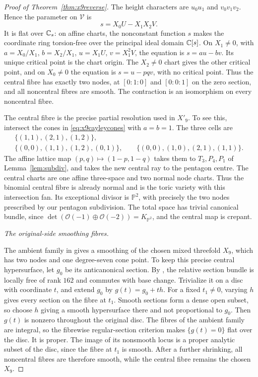 \begin{proof}[Proof of Theorem~\ref{thm:x9reverse}]
The height characters are $u_0u_1$ and $v_0v_1v_2$. Hence the parameter
on $\mathcal V$ is
\begin{equation}\label{eq:x9simultaneous}
 s=X_0U-X_1X_2V.
\end{equation}
It is flat over $\mathbb C_s$: on affine charts, the nonconstant function $s$
makes the coordinate ring torsion-free over the principal ideal domain
$\mathbb C[s]$. On $X_1\ne0$, with
$a=X_0/X_1$, $b=X_2/X_1$, $u=X_1U$, $v=X_1^2V$, the equation is
$s=au-bv$. Its unique critical point is the chart origin. The
$X_2\ne0$ chart gives the other critical point, and on $X_0\ne0$ the
equation is $s=u-pqv$, with no critical point. Thus the central fibre
has exactly two nodes, at $[0:1:0]$ and $[0:0:1]$ on the zero section,
and all noncentral fibres are smooth. The contraction is an isomorphism
on every noncentral fibre.

The central fibre is the precise partial resolution used in $X'_9$.
To see this, intersect the cones in \eqref{eq:x9cayleycones} with
$a=b=1$. The three cells are
\[
\begin{gathered}
 \{(1,1),(2,1),(1,2)\},\\
 \{(0,0),(1,1),(1,2),(0,1)\},\qquad
 \{(0,0),(1,0),(2,1),(1,1)\}.
\end{gathered}
\]
The affine lattice map $(p,q)\mapsto(1-p,1-q)$ takes them to
$T_3,P_4,P_1$ of Lemma~\ref{lem:subdiv}, and takes the new central
ray to the pentagon centre. The central charts are one affine
three-space and two normal node charts. Thus the binomial central
fibre is already normal and is the toric variety with this intersection
fan. Its exceptional divisor is $\mathbb P^2$, with precisely the two
nodes prescribed by our pentagon subdivision. The total space has
trivial canonical bundle, since
$\det(\mathcal O(-1)\oplus\mathcal O(-2))=K_{\mathbb P^2}$, and
the central map is crepant.

\emph{The original-side smoothing fibres.}

The ambient family in \cite[Theorem~11.8]{Paper5} gives a smoothing
of the chosen mixed threefold $X_9$, which has two nodes and one
degree-seven cone point. To keep this precise central hypersurface,
let $g_0$ be its anticanonical section. By
\cite[Proposition~11.7]{Paper5}, the relative section bundle is locally
free of rank $162$ and commutes with base change. Trivialize it on a
disc with coordinate $t$, and extend $g_0$ by
$g(t)=g_0+t h$. For a fixed $t_1\ne0$, varying $h$ gives every section
on the fibre at $t_1$. Smooth sections form a dense open subset, so
choose $h$ giving a smooth hypersurface there and not proportional to
$g_0$. Then $g(t)$ is nonzero throughout the original disc. The
fibres of the ambient family are integral, so the fibrewise
regular-section criterion makes $\{g(t)=0\}$ flat over the disc.
It is proper. The image of its nonsmooth locus is a proper analytic
subset of the disc, since the fibre at $t_1$ is smooth. After a further
shrinking, all noncentral fibres are therefore smooth, while the
central fibre remains the chosen $X_9$.


\end{proof}
